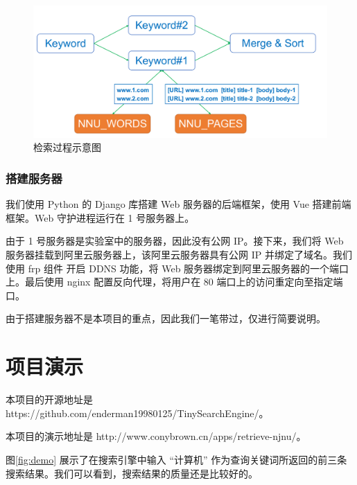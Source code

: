 \documentclass{ctexart}
\begin{document}
    \begin{figure}[t]
        \centering
        \includegraphics[width=\textwidth]{src/retrieve}
        \caption{检索过程示意图}
        \label{fig:retrieve}
    \end{figure}

    \subsubsection{搭建服务器}\label{subsubsec:retrieve_server}

    我们使用 Python 的 Django 库搭建 Web 服务器的后端框架，使用 Vue 搭建前端框架。Web 守护进程运行在 1 号服务器上。

    由于 1 号服务器是实验室中的服务器，因此没有公网 IP。接下来，我们将 Web 服务器挂载到阿里云服务器上，该阿里云服务器具有公网 IP 并绑定了域名。我们使用 frp 组件\cite{github-frp} 开启 DDNS 功能，将 Web 服务器绑定到阿里云服务器的一个端口上。最后使用 nginx 配置反向代理，将用户在 80 端口上的访问重定向至指定端口。

    由于搭建服务器不是本项目的重点，因此我们一笔带过，仅进行简要说明。


    \section{项目演示}\label{sec:demo}

    本项目的开源地址是 https://github.com/enderman19980125/TinySearchEngine/。

    本项目的演示地址是 http://www.conybrown.cn/apps/retrieve-njnu/。

    图\ref{fig:demo} 展示了在搜索引擎中输入 “计算机” 作为查询关键词所返回的前三条搜索结果。我们可以看到，搜索结果的质量还是比较好的。
\end{document}
